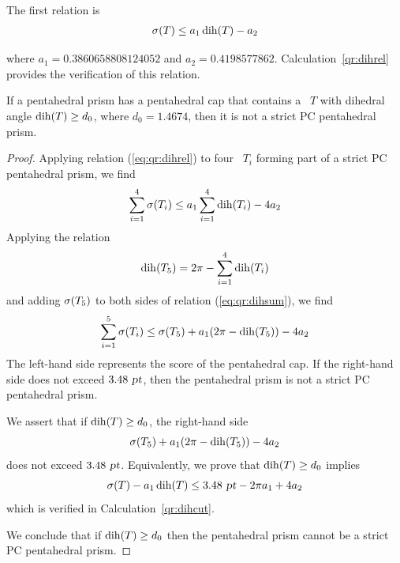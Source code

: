 The first relation is
\begin{eqnarray}
\operatorname{\sigma}(T) \le a_1 \operatorname{dih}(T) - a_2  \label{eq:qr:dihrel}
\end{eqnarray}

where $a_1 = 0.3860658808124052$ and $a_2 = 0.4198577862$.
Calculation~\ref{qr:dihrel}
provides the verification of this relation.



\begin{lem}
\label{lem:dihcut}
If a pentahedral prism has a pentahedral cap that contains a \qrtet\ $T$ with
dihedral angle $\operatorname{dih}(T) \ge d_0$,
where $d_0 = 1.4674$, then it is not a strict PC pentahedral prism.
\end{lem}

\begin{proof}
Applying relation (\ref{eq:qr:dihrel}) to four \qrtets\ $T_i$ forming part of a strict PC pentahedral
prism, we find
\begin{eqnarray}
\sum_{i=1}^4 \operatorname{\sigma}(T_i) \le a_1 \sum_{i=1}^4 \operatorname{dih}(T_i) - 4 a_2 \label{eq:qr:dihsum}
\end{eqnarray}
Applying the relation
\begin{eqnarray}
\operatorname{dih}(T_5) = 2 \pi - \sum_{i=1}^4 \operatorname{dih}(T_i) \label{eq:qr:dihsum2}
\end{eqnarray}
and adding $\operatorname{\sigma}(T_5)$ to both sides of relation (\ref{eq:qr:dihsum}),
we find
\begin{eqnarray}
\sum_{i=1}^5 \operatorname{\sigma}(T_i) \le \operatorname{\sigma}(T_5) + a_1 (2 \pi - \operatorname{dih}(T_5)) - 4 a_2 \label{eq:qr:dihsum3}
\end{eqnarray}
The left-hand side represents the score of the pentahedral cap.
If the right-hand side does not exceed $3.48 \text{ \sl pt}$,
then the pentahedral prism is not a strict PC pentahedral prism.



We assert that if $\operatorname{dih}(T) \ge d_0$,
the right-hand side
\[
\operatorname{\sigma}(T_5)  + a_1 (2 \pi - \operatorname{dih}(T_5)) - 4 a_2
\]
does not exceed $3.48 \text{ \sl pt}$.  Equivalently,
we prove that
$\operatorname{dih}(T) \ge d_0$ implies
\[
\operatorname{\sigma}(T) - a_1 \operatorname{dih}(T) \le 3.48 \text{ \sl pt} - 2 \pi a_1 + 4 a_2
\]
which is verified in Calculation~\ref{qr:dihcut}.

We conclude that if $\operatorname{dih}(T) \ge d_0$
 then the pentahedral prism cannot be a strict PC pentahedral prism.

\end{proof}

